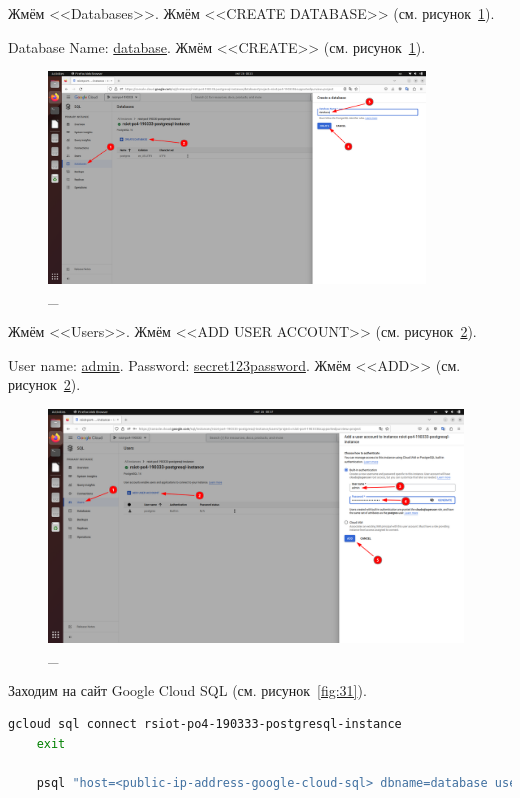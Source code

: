 \documentclass[12pt, a4paper, simple]{eskdtext}
\begin{document}
  Жмём <<Databases>>. Жмём <<CREATE DATABASE>> (см. рисунок~\ref{fig:29}).

  Database Name: \underline{database}. Жмём <<CREATE>> (см. рисунок~\ref{fig:29}).

  \begin{figure}[!h]
    \centering
    \includegraphics[width=10cm]
    {images/2023-02-26_00-56-11.png}
    \caption{\_}
    \label{fig:29}
  \end{figure}

  Жмём <<Users>>. Жмём <<ADD USER ACCOUNT>> (см. рисунок~\ref{fig:30}).

  User name: \underline{admin}. Password: \underline{secret123password}. Жмём <<ADD>> (см. рисунок~\ref{fig:30}).

  \begin{figure}[!h]
    \centering
    \includegraphics[width=11cm]
    {images/2023-02-26_00-57-31.png}
    \caption{\_}
    \label{fig:30}
  \end{figure}

  \newpage
  Заходим на сайт Google Cloud SQL \cite{GoogleCloudSql} (см. рисунок~\ref{fig:31}).

  \begin{lstlisting}[language=bash,name=Подключаюсь к БД через Google Cloud Shell]
    gcloud sql connect rsiot-po4-190333-postgresql-instance
    exit

    psql "host=<public-ip-address-google-cloud-sql> dbname=database user=admin"
  \end{lstlisting}
\end{document}
